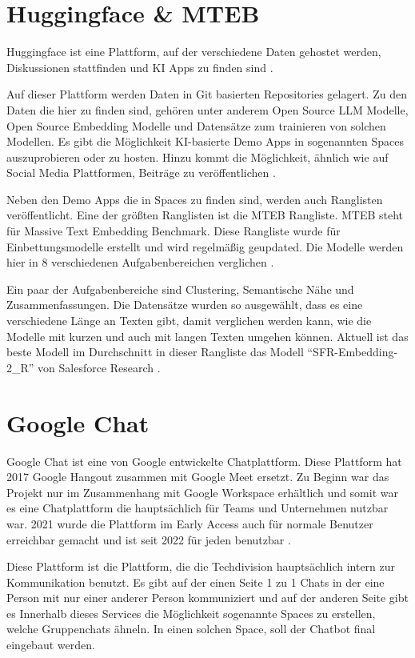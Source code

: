 \section{Huggingface \& MTEB }
\label{s:intro:hug}
Huggingface ist eine Plattform, auf der verschiedene Daten 
gehostet werden, Diskussionen stattfinden und KI Apps 
zu finden sind \cite{HuggingFaceAI2024}. \par
Auf dieser Plattform werden Daten in Git basierten Repositories 
gelagert. Zu den Daten die hier zu finden sind,
gehören unter anderem Open Source LLM Modelle, Open Source Embedding Modelle 
und Datensätze zum trainieren von solchen Modellen. 
Es gibt die Möglichkeit KI-basierte Demo Apps in sogenannten Spaces auszuprobieren 
oder zu hosten. Hinzu kommt die Möglichkeit, 
ähnlich wie auf Social Media Plattformen, Beiträge zu veröffentlichen \cite{HuggingFaceAI2024}.\par
Neben den Demo Apps die in Spaces zu finden sind, werden auch Ranglisten 
veröffentlicht. Eine der größten Ranglisten ist die MTEB Rangliste. MTEB 
steht für Massive Text Embedding Benchmark. Diese Rangliste wurde für Einbettungsmodelle 
erstellt und wird regelmäßig geupdated. Die Modelle werden hier in 8 verschiedenen Aufgabenbereichen
verglichen \cite{muennighoffMTEBMassiveText2023, MTEBLeaderboardHugging}. \par 
Ein paar der Aufgabenbereiche sind Clustering, Semantische Nähe und Zusammenfassungen. 
Die Datensätze wurden so ausgewählt, dass es eine verschiedene Länge an Texten gibt,
damit verglichen werden kann, wie die Modelle mit kurzen und auch mit langen 
Texten umgehen können. Aktuell ist das beste Modell im Durchschnitt in dieser 
Rangliste das Modell ``SFR-Embedding-2\_R'' von Salesforce Research \cite{muennighoffMTEBMassiveText2023, MTEBLeaderboardHugging}.

\section{Google Chat}
Google Chat ist eine von Google entwickelte Chatplattform. Diese Plattform 
hat 2017 Google Hangout zusammen mit Google Meet ersetzt. Zu Beginn war das 
Projekt nur im Zusammenhang mit Google Workspace erhältlich und somit war es 
eine Chatplattform die hauptsächlich für Teams und Unternehmen nutzbar war. 
2021 wurde die Plattform im Early Access auch für normale Benutzer erreichbar 
gemacht und ist seit 2022 für jeden benutzbar \cite{GoogleChat2024}.\par
Diese Plattform ist die Plattform, die die Techdivision hauptsächlich intern 
zur Kommunikation benutzt. Es gibt auf der einen Seite 1 zu 1 Chats in der eine 
Person mit nur einer anderer Person kommuniziert und auf der anderen Seite gibt es 
Innerhalb dieses Services die Möglichkeit 
sogenannte Spaces zu erstellen, welche Gruppenchats ähneln. In einen
solchen Space, soll 
der Chatbot final eingebaut werden.
